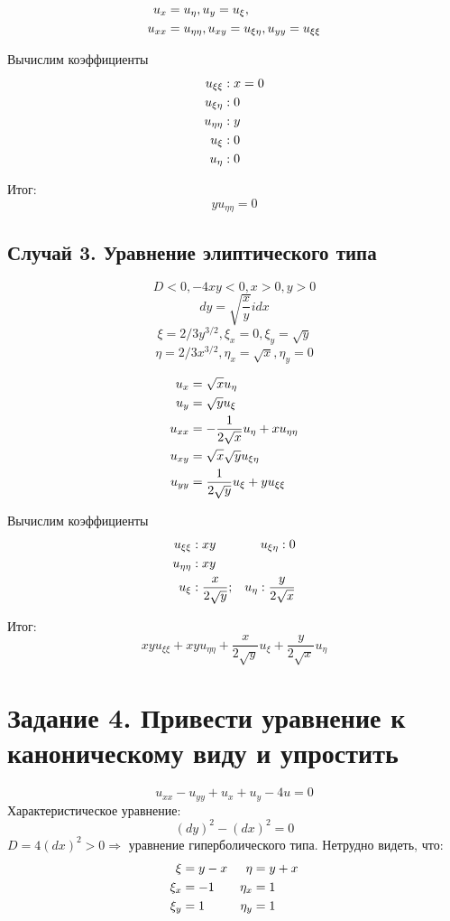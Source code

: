 \documentclass[12pt]{article}
\begin{document}
\begin{align}
u_x &= u_\eta, \notag
u_y = u_\xi, \notag \\
u_{xx} &= u_{\eta\eta}, \notag
u_{xy} = u_{\xi\eta}, \notag
u_{yy} = u_{\xi\xi} \notag
\end{align}

Вычислим коэффициенты
\begin{align}
u_{\xi\xi} &: x = 0 \notag \\
u_{\xi\eta} &: 0 \notag \\
u_{\eta\eta} &: y \notag \\
u_{\xi} &: 0 \notag \\
u_\eta &: 0 \notag
\end{align}

Итог:
$$yu_{\eta\eta} = 0$$

\subsection{Случай 3. Уравнение элиптического типа}
$$D < 0, -4xy < 0, x>0, y>0$$
$$dy = \sqrt{\frac{x}{y}}idx$$
$$\xi = 2/3y^{3/2}, \xi_x = 0, \xi_y = \sqrt{y}$$
$$\eta = 2/3x^{3/2}, \eta_x = \sqrt{x}, \eta_y = 0$$

\begin{align}
u_x &= \sqrt{x}u_\eta \notag \\
u_y &= \sqrt{y}u_\xi \notag \\
u_{xx} &= -\frac{1}{2\sqrt{x}}u_\eta + xu_{\eta\eta} \notag \\
u_{xy} &= \sqrt{x}\sqrt{y}u_{\xi\eta} \notag \\
u_{yy} &= \frac{1}{2\sqrt{y}}u_\xi + yu_{\xi\xi} \notag
\end{align}

Вычислим коэффициенты
\begin{align}
u_{\xi\xi} &: xy \notag     &u_{\xi\eta} : 0 \notag \\
u_{\eta\eta} &: xy \notag \\
u_\xi &: \frac{x}{2\sqrt{y}}; &u_\eta : \frac{y}{2\sqrt{x}} \notag 
\end{align}

Итог:
$$xyu_{\xi\xi} + xyu_{\eta\eta} + \frac{x}{2\sqrt{y}}u_\xi + \frac{y}{2\sqrt{x}}u_\eta$$

\section{Задание 4. Привести уравнение к каноническому виду и упростить}
$$u_{xx} - u_{yy} + u_x + u_y - 4u = 0$$
Характеристическое уравнение:
$$(dy)^2 - (dx)^2 = 0$$
$D = 4(dx)^2 > 0 \Rightarrow$ уравнение гиперболического типа.
Нетрудно видеть, что: 
\begin{align}
\xi &= y-x &\eta &= y+x \notag \\
\xi_x &= -1 &\eta_x &= 1 \notag \\
\xi_y &= 1 &\eta_y &= 1 \notag 
\end{align}
\end{document}
